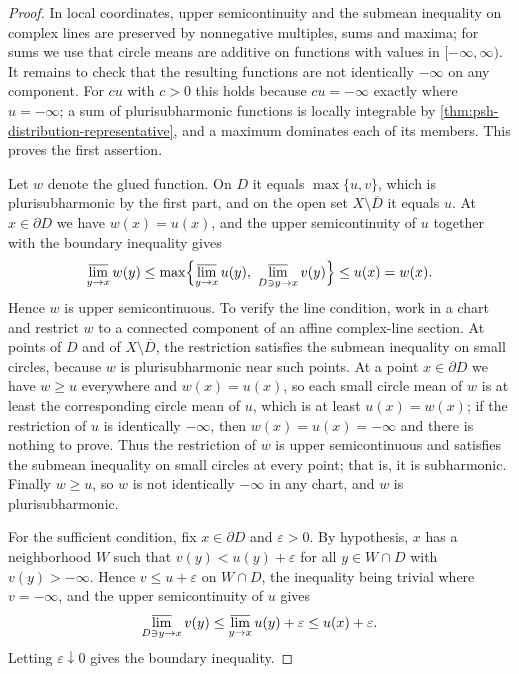 \begin{proof}
In local coordinates, upper semicontinuity and the submean inequality on complex lines are preserved by nonnegative multiples, sums and maxima; for sums we use that circle means are additive on functions with values in $[-\infty,\infty)$. It remains to check that the resulting functions are not identically $-\infty$ on any component. For $cu$ with $c>0$ this holds because $cu=-\infty$ exactly where $u=-\infty$; a sum of plurisubharmonic functions is locally integrable by \cref{thm:psh-distribution-representative}, and a maximum dominates each of its members. This proves the first assertion.

Let $w$ denote the glued function. On $D$ it equals $\max\{u,v\}$, which is plurisubharmonic by the first part, and on the open set $X\setminus\overline D$ it equals $u$. At $x\in\partial D$ we have $w(x)=u(x)$, and the upper semicontinuity of $u$ together with the boundary inequality gives
\[
 \varlimsup_{y\to x}w(y)\leq\max\Bigl\{\varlimsup_{y\to x}u(y),\ \varlimsup_{D\ni y\to x}v(y)\Bigr\}\leq u(x)=w(x).
\]
Hence $w$ is upper semicontinuous. To verify the line condition, work in a chart and restrict $w$ to a connected component of an affine complex-line section. At points of $D$ and of $X\setminus\overline D$, the restriction satisfies the submean inequality on small circles, because $w$ is plurisubharmonic near such points. At a point $x\in\partial D$ we have $w\geq u$ everywhere and $w(x)=u(x)$, so each small circle mean of $w$ is at least the corresponding circle mean of $u$, which is at least $u(x)=w(x)$; if the restriction of $u$ is identically $-\infty$, then $w(x)=u(x)=-\infty$ and there is nothing to prove. Thus the restriction of $w$ is upper semicontinuous and satisfies the submean inequality on small circles at every point; that is, it is subharmonic. Finally $w\geq u$, so $w$ is not identically $-\infty$ in any chart, and $w$ is plurisubharmonic.

For the sufficient condition, fix $x\in\partial D$ and $\varepsilon>0$. By hypothesis, $x$ has a neighborhood $W$ such that $v(y)<u(y)+\varepsilon$ for all $y\in W\cap D$ with $v(y)>-\infty$. Hence $v\leq u+\varepsilon$ on $W\cap D$, the inequality being trivial where $v=-\infty$, and the upper semicontinuity of $u$ gives
\[
 \varlimsup_{D\ni y\to x}v(y)\leq\varlimsup_{y\to x}u(y)+\varepsilon\leq u(x)+\varepsilon.
\]
Letting $\varepsilon\downarrow0$ gives the boundary inequality.
\end{proof}

